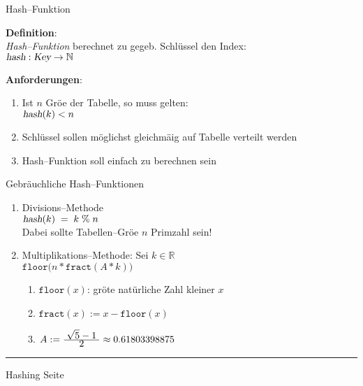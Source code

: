 
\begin{slide}{}
\normalsize

\begin{center}
Hash--Funktion
\end{center}
\vspace*{0.5cm}

\footnotesize

\textbf{Definition}: \\[0.3cm]
\emph{Hash--Funktion} berechnet zu gegeb. Schl\"ussel den Index: \\[0.3cm]
\hspace*{1.3cm} $\textsl{hash}: \textsl{Key} \rightarrow \mathbb{N}$

\textbf{Anforderungen}:
\begin{enumerate}
\item Ist $n$ Gr\"o\3e der Tabelle, so muss gelten: \\[0.3cm]
      \hspace*{1.3cm} $\textsl{hash}(k) < n$
\item Schl\"ussel sollen m\"oglichst gleichm\"a\3ig auf Tabelle verteilt werden
\item Hash--Funktion soll einfach zu berechnen sein
\end{enumerate}
Gebr\"auchliche Hash--Funktionen
\begin{enumerate}
\item Divisions--Methode \\[0.3cm]
      \hspace*{1.3cm} $\textsl{hash}(k) \;=\; k\;\%\; n$ \\[0.3cm]
      Dabei sollte Tabellen--Gr\"o\3e $n$  Primzahl sein!
\item Multiplikations--Methode: Sei $k\in\mathbb{R}$ \\[0.3cm]
      \hspace*{1.3cm} $\mathtt{floor}\bigg(n * \mathtt{fract}(A * k) \bigg)$ 
      \begin{enumerate}
      \item $\mathtt{floor}(x)$: gr\"o\3te nat\"urliche Zahl kleiner $x$
      \item $\mathtt{fract}(x) := x - \mathtt{floor}(x)$
      \item $A := \frac{\displaystyle\;\sqrt{5} - 1\;}{\displaystyle\;2\;} \approx 0.61803398875$    
      \end{enumerate}
\end{enumerate}


\vspace*{\fill}
\tiny \addtocounter{mypage}{1}
\rule{17cm}{1mm}
Hashing  \hspace*{\fill} Seite 
\end{slide}

